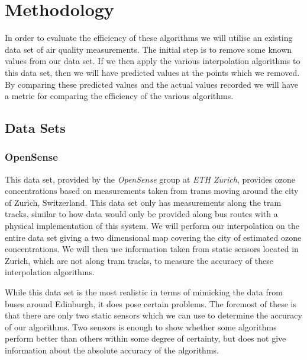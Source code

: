 	\section{Methodology}\label{prediction_evaluation_methodology}

		In order to evaluate the efficiency of these algorithms we will utilise an existing data set of air quality measurements. The initial step is to remove some known values from our data set. If we then apply the various interpolation algorithms to this data set, then we will have predicted values at the points which we removed. By comparing these predicted values and the actual values recorded we will have a metric for comparing the efficiency of the various algorithms. 

		\subsection{Data Sets}\label{prediction_evaluation_methodology_data_sets}

			\subsubsection{OpenSense}\label{prediction_evaluation_methodology_data_sets_opensense}


				This data set, provided by the \emph{OpenSense} group at \emph{ETH Zurich}, provides ozone concentrations based on measurements taken from trams moving around the city of Zurich, Switzerland. This data set only has measurements along the tram tracks, similar to how data would only be provided along bus routes with a physical implementation of this system. We will perform our interpolation on the entire data set giving a two dimensional map covering the city of estimated ozone concentrations. We will then use information taken from static sensors located in Zurich, which are not along tram tracks, to measure the accuracy of these interpolation algorithms. 


				While this data set is the most realistic in terms of mimicking the data from buses around Edinburgh, it does pose certain problems. The foremost of these is that there are only two static sensors which we can use to determine the accuracy of our algorithms. Two sensors is enough to show whether some algorithms perform better than others within some degree of certainty, but does not give information about the absolute accuracy of the algorithms. 

